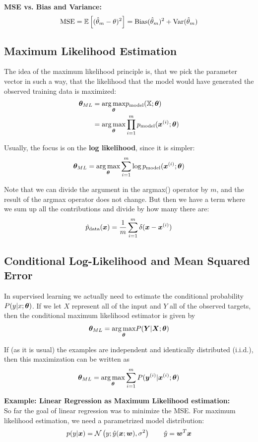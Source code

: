 \begin{multicols}{2}
	\textbf{MSE vs. Bias and Variance:}
	\[ \text{MSE} = \mathbb{E}\left[(\hat{\theta}_m-\theta)^2\right] = \text{Bias}(\hat{\theta}_m)^2+\text{Var}(\hat{\theta}_m) \]


	\subsection{Maximum Likelihood Estimation}
	The idea of the maximum likelihood principle is, that we pick the parameter vector in such a way, that the likelihood that the model would have generated the observed training data is maximized:
	\begin{align*}
	\bol{\theta}_{ML}
	&= \underset{\bol{\theta}}{\arg \max} p_{\text{model}} (\mathbb{X};\bol{\theta})\\
	&= \underset{\bol{\theta}}{\arg \max} \prod_{i=1}^{m} p_{\text{model}} (\bol{x}^{(i)};\bol{\theta})
	\end{align*}

	Usually, the focus is on the \textbf{log likelihood}, since it is simpler:
	\[\bol{\theta}_{ML} = \underset{\bol{\theta}}{\arg \max} \sum_{i=1}^{m} \log p_{\text{model}} (\bol{x}^{(i)};\bol{\theta}) \]

	Note that we can divide the argument in the argmax() operator by $m$, and the result of the argmax operator does not change. But then we have a term where we sum up all the contributions and divide by how many there are:
	\[ \hat{p}_{\text{data}}(\bol{x}) = \frac{1}{m} \sum_{i=1}^{m} \delta(\bol{x}-\bol{x}^{(i)}) \]

	\subsection{Conditional Log-Likelihood and Mean Squared Error}
	In supervised learning we actually need to estimate the conditional probability $P(y|x;\bol{\theta})$.
	If we let $X$ represent all of the input and $Y$ all of the observed targets, then the conditional maximum likelihood estimator is given by
	\[ \bol{\theta}_{ML} = \underset{\bol{\theta}}{\arg \max} P(\bol{Y}|\bol{X};\bol{\theta}) \]

	If (as it is usual) the examples are independent and identically distributed (i.i.d.), then this maximization can be written as
	\[ \bol{\theta}_{ML} = \underset{\bol{\theta}}{\arg \max} \sum_{i=1}^{m} P(\bol{y}^{(i)}|\bol{x}^{(i)};\bol{\theta}) \]

	\textbf{Example: Linear Regression as Maximum Likelihood estimation:}\\
	So far the goal of linear regression was to minimize the MSE.
	For maximum likelihood estimation, we need a parametrized model distribution:
	\[ p(y|\bol{x}) = \mathcal{N}\left(y;\hat{y}(\bol{x};\bol{w}),\sigma^2\right) \qquad
	\hat{y} = \bol{w}^T\bol{x} \]


\end{multicols}

